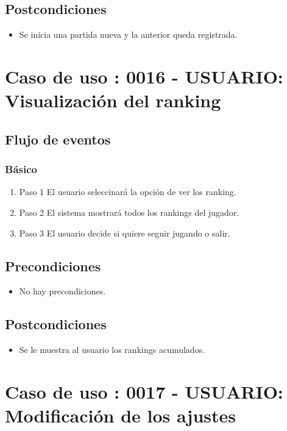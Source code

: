 \subsection{Postcondiciones}
\begin{itemize}
\item Se inicia una partida nueva y la anterior queda registrada. 
\end{itemize}




\section{Caso de uso : 0016 - USUARIO: Visualización del ranking}\label{sec:uc0}

\subsection{Flujo de eventos}

\subsubsection{Básico}

\begin{enumerate}
\item Paso 1
El usuario seleccinará la opción de ver los ranking. 
\item Paso 2
El sistema mostrará todos los rankings del jugador.
\item Paso 3
El usuario decide si quiere seguir jugando o salir.
\end{enumerate}

\subsection{Precondiciones}
\begin{itemize}
\item No hay precondiciones.
\end{itemize}
\subsection{Postcondiciones}
\begin{itemize}
\item Se le muestra al usuario los rankings acumulados. 
\end{itemize}



\section{Caso de uso : 0017 - USUARIO: Modificación de los ajustes}\label{sec:uc0}

